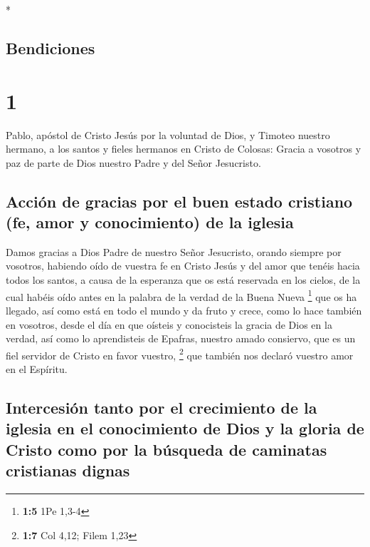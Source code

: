 \begin{paracol}{2} \switchcolumn[0]*

\hypertarget{bendiciones}{%
\subsection{Bendiciones}\label{bendiciones}}

\hypertarget{section}{%
\section{1}\label{section}}

 Pablo, apóstol de Cristo Jesús por la voluntad de Dios, y
Timoteo nuestro hermano,  a los santos y fieles hermanos
en Cristo de Colosas: Gracia a vosotros y paz de parte de Dios nuestro
Padre y del Señor Jesucristo.

\hypertarget{acciuxf3n-de-gracias-por-el-buen-estado-cristiano-fe-amor-y-conocimiento-de-la-iglesia}{%
\subsection{Acción de gracias por el buen estado cristiano (fe, amor y
conocimiento) de la
iglesia}\label{acciuxf3n-de-gracias-por-el-buen-estado-cristiano-fe-amor-y-conocimiento-de-la-iglesia}}

 Damos gracias a Dios Padre de nuestro Señor Jesucristo,
orando siempre por vosotros,  habiendo oído de vuestra fe
en Cristo Jesús y del amor que tenéis hacia todos los santos,
 a causa de la esperanza que os está reservada en los
cielos, de la cual habéis oído antes en la palabra de la verdad de la
Buena Nueva \footnote{\textbf{1:5} 1Pe 1,3-4}  que os ha
llegado, así como está en todo el mundo y da fruto y crece, como lo hace
también en vosotros, desde el día en que oísteis y conocisteis la gracia
de Dios en la verdad,  así como lo aprendisteis de
Epafras, nuestro amado consiervo, que es un fiel servidor de Cristo en
favor vuestro, \footnote{\textbf{1:7} Col 4,12; Filem 1,23}
 que también nos declaró vuestro amor en el Espíritu.

\hypertarget{intercesiuxf3n-tanto-por-el-crecimiento-de-la-iglesia-en-el-conocimiento-de-dios-y-la-gloria-de-cristo-como-por-la-buxfasqueda-de-caminatas-cristianas-dignas}{%
\subsection{Intercesión tanto por el crecimiento de la iglesia en el
conocimiento de Dios y la gloria de Cristo como por la búsqueda de
caminatas cristianas
dignas}\label{intercesiuxf3n-tanto-por-el-crecimiento-de-la-iglesia-en-el-conocimiento-de-dios-y-la-gloria-de-cristo-como-por-la-buxfasqueda-de-caminatas-cristianas-dignas}}


\end{paracol}

